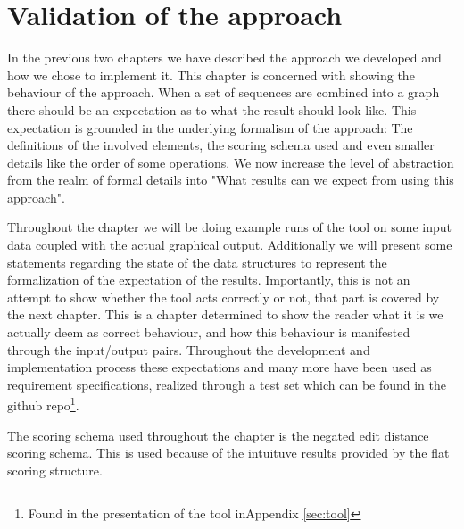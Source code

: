 \documentclass[thesis.tex]{subfiles}
\begin{document}
\chapter{Validation of the approach}
\label{sec:validation}
In the previous two chapters we have described the approach we developed and how we chose to implement it. This chapter is concerned with showing the behaviour of the approach. When a set of sequences are combined into a graph there should be an expectation as to what the result should look like. This expectation is grounded in the underlying formalism of the approach: The definitions of the involved elements, the scoring schema used and even smaller details like the order of some operations. We now increase the level of abstraction from the realm of formal details into "What results can we expect from using this approach".\\
\par\noindent
Throughout the chapter we will be doing example runs of the tool on some input data coupled with the actual graphical output. Additionally we will present some statements regarding the state of the data structures to represent the formalization of the expectation of the results. Importantly, this is not an attempt to show whether the tool acts correctly or not, that part is covered by the next chapter. This is a chapter determined to show the reader what it is we actually deem as correct behaviour, and how this behaviour is manifested through the input/output pairs. Throughout the development and implementation process these expectations and many more have been used as requirement specifications, realized through a test set which can be found in the github repo\footnote{Found in the presentation of the tool inAppendix \ref{sec:tool}}.\\
\par\noindent
The scoring schema used throughout the chapter is the negated edit distance scoring schema. This is used because of the intuituve results provided by the flat scoring structure. 
\end{document}
